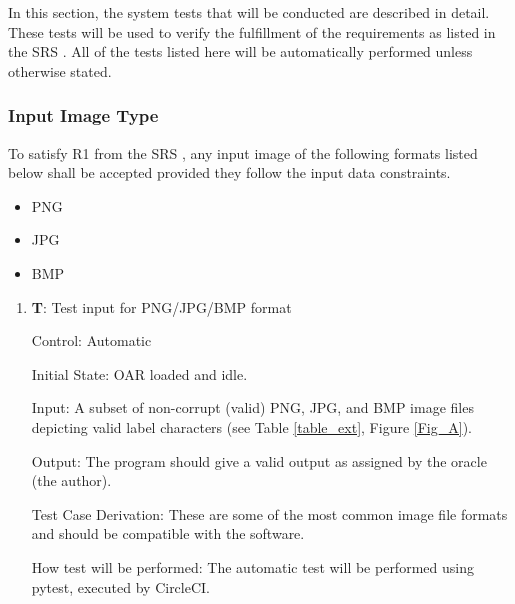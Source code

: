 \documentclass[12pt, titlepage]{article}
\newcounter{testnum} %
\begin{document}
In this section, the system tests that will be conducted are described in detail. These tests
will be used to verify the fulfillment of the requirements as listed in the SRS \citep{SRS}.
All of the tests listed here will be automatically performed unless otherwise stated.

\subsubsection{Input Image Type}

To satisfy R1 from the SRS \citep{SRS}, any input image of the following formats listed below shall be 
accepted provided they follow the input data constraints.

\begin{itemize}
  \item{PNG}
  \item{JPG}
  \item{BMP\\}
\end{itemize}

\begin{enumerate}

  \item{\textbf{T\thetestnum \label{T_inputImage}}: Test input for PNG/JPG/BMP format\\}
            
  Control: Automatic
            
  Initial State: OAR loaded and idle.
            
  Input: A subset of non-corrupt (valid) PNG, JPG, and BMP image files depicting valid label characters (see Table \ref{table_ext}, Figure \ref{Fig_A}).
            
  Output: The program should give a valid output as assigned by the oracle (the author).
            
  Test Case Derivation: These are some of the most common image file formats and should be compatible with the software.
            
  How test will be performed: The automatic test will be performed using pytest, executed by CircleCI.
\end{enumerate}
\end{document}

